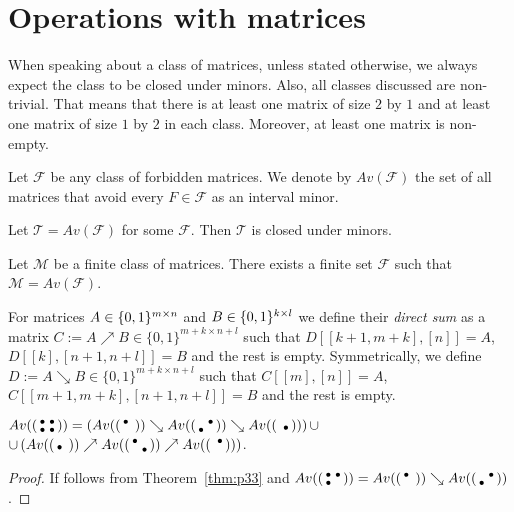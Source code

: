 \chapter{Operations with matrices}
\begin{ntn}
When speaking about a class of matrices, unless stated otherwise, we always expect the class to be closed under minors. Also, all classes discussed are non-trivial. That means that there is at least one matrix of size $2$ by $1$ and at least one matrix of size $1$ by $2$ in each class. Moreover, at least one matrix is non-empty.
\end{ntn}
\begin{defn}
Let $\mathcal{F}$ be any class of forbidden matrices. We denote by $Av(\mathcal{F})$ the set of all matrices that avoid every $F\in\mathcal{F}$ as an interval minor.
\end{defn}
\begin{obs}
Let $\mathcal{T}=Av(\mathcal{F})$ for some $\mathcal{F}$. Then $\mathcal{T}$ is closed under minors.
\end{obs}
\begin{obs}
Let $\mathcal{M}$ be a finite class of matrices. There exists a finite set $\mathcal{F}$ such that $\mathcal{M}=Av(\mathcal{F})$.
\end{obs}
\begin{defn}
For matrices $A\in\{0,1\}^{m\times n}$ and $B\in\{0,1\}^{k\times l}$ we define their \emph{direct sum} as a matrix $C:=A\nearrow B\in\{0,1\}^{m+k\times n+l}$ such that $D[[k+1,m+k],[n]]=A$, $D[[k],[n+1,n+l]]=B$ and the rest is empty. Symmetrically, we define $D:=A\searrow B\in\{0,1\}^{m+k\times n+l}$ such that $C[[m],[n]]=A$, $C[[m+1,m+k],[n+1,n+l]]=B$ and the rest is empty.
\end{defn}
\begin{thm}
$Av(\left(\begin{smallmatrix}\bullet&\bullet\\\bullet&\bullet\end{smallmatrix}\right))=\left(Av(\left(\begin{smallmatrix}\bullet& \\ & \end{smallmatrix}\right))\searrow Av(\left(\begin{smallmatrix} &\bullet\\\bullet& \end{smallmatrix}\right))\searrow Av(\left(\begin{smallmatrix} & \\ &\bullet\end{smallmatrix}\right))\right)\cup$\\
$\cup\left(Av(\left(\begin{smallmatrix} & \\\bullet& \end{smallmatrix}\right))\nearrow Av(\left(\begin{smallmatrix}\bullet& \\ &\bullet\end{smallmatrix}\right))\nearrow Av(\left(\begin{smallmatrix} &\bullet\\ & \end{smallmatrix}\right))\right)$.
\end{thm}
\begin{proof}
If follows from Theorem~\ref{thm:p33} and $Av(\left(\begin{smallmatrix}\bullet&\bullet\\\bullet& \end{smallmatrix}\right))=Av(\left(\begin{smallmatrix}\bullet& \\ & \end{smallmatrix}\right))\searrow Av(\left(\begin{smallmatrix} &\bullet\\\bullet& \end{smallmatrix}\right))$.
\end{proof}
